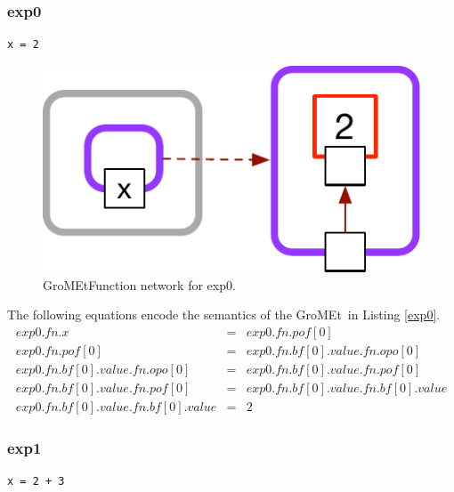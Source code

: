 \documentclass{article}
\newcommand{\gromet}{GroMEt}
\begin{document}
\subsubsection{exp0}

\begin{lstlisting}[caption=Python code for example exp0., label=exp0]
x = 2
\end{lstlisting}



\begin{figure}[htb]
\includegraphics[width=0.5\linewidth]{fig/exp0_gromet_FN_manual_diagram.pdf}
\caption{\gromet Function network for exp0.}
\end{figure}


    


The following equations encode the semantics of the \gromet\ in Listing \ref{exp0}.
\begin{eqnarray*}
    exp0.fn.x &=& exp0.fn.pof[0]\\
    exp0.fn.pof[0] &=& exp0.fn.bf[0].value.fn.opo[0]\\
    exp0.fn.bf[0].value.fn.opo[0] &=& exp0.fn.bf[0].value.fn.pof[0]\\
    exp0.fn.bf[0].value.fn.pof[0] &=& exp0.fn.bf[0].value.fn.bf[0].value\\
    exp0.fn.bf[0].value.fn.bf[0].value &=& 2
\end{eqnarray*}

\clearpage
\subsubsection{exp1}

\begin{lstlisting}[caption=Python code for example exp1., label=exp1]
x = 2 + 3
\end{lstlisting}
\end{document}
